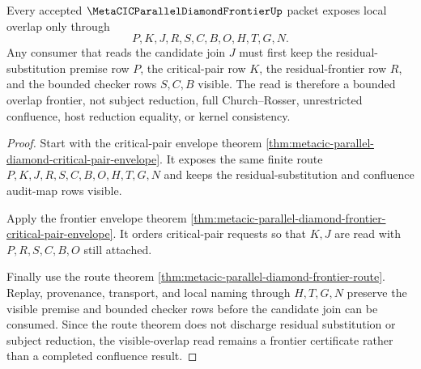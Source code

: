 \begin{theorem}
\label{thm:metacic-parallel-diamond-frontier-visible-overlap}
Every accepted $\MetaCICParallelDiamondFrontierUp$ packet exposes local overlap only through
$$
P,K,J,R,S,C,B,O,H,T,G,N .
$$
Any consumer that reads the candidate join $J$ must first keep the residual-substitution premise row $P$, the critical-pair row $K$, the residual-frontier row $R$, and the bounded checker rows $S,C,B$ visible. The read is therefore a bounded overlap frontier, not subject reduction, full Church--Rosser, unrestricted confluence, host reduction equality, or kernel consistency.
\end{theorem}
\begin{proof}
Start with the critical-pair envelope theorem \autoref{thm:metacic-parallel-diamond-critical-pair-envelope}. It exposes the same finite route $P,K,J,R,S,C,B,O,H,T,G,N$ and keeps the residual-substitution and confluence audit-map rows visible.

Apply the frontier envelope theorem \autoref{thm:metacic-parallel-diamond-frontier-critical-pair-envelope}. It orders critical-pair requests so that $K,J$ are read with $P,R,S,C,B,O$ still attached.

Finally use the route theorem \autoref{thm:metacic-parallel-diamond-frontier-route}. Replay, provenance, transport, and local naming through $H,T,G,N$ preserve the visible premise and bounded checker rows before the candidate join can be consumed. Since the route theorem does not discharge residual substitution or subject reduction, the visible-overlap read remains a frontier certificate rather than a completed confluence result.
\end{proof}
